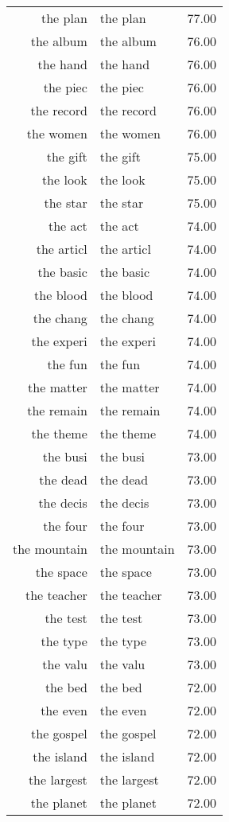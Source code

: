 \begin{table}[ht]
\begin{tabular}{rlr}
  the plan & the plan & 77.00 \\ 
  the album & the album & 76.00 \\ 
  the hand & the hand & 76.00 \\ 
  the piec & the piec & 76.00 \\ 
  the record & the record & 76.00 \\ 
  the women & the women & 76.00 \\ 
  the gift & the gift & 75.00 \\ 
  the look & the look & 75.00 \\ 
  the star & the star & 75.00 \\ 
  the act & the act & 74.00 \\ 
  the articl & the articl & 74.00 \\ 
  the basic & the basic & 74.00 \\ 
  the blood & the blood & 74.00 \\ 
  the chang & the chang & 74.00 \\ 
  the experi & the experi & 74.00 \\ 
  the fun & the fun & 74.00 \\ 
  the matter & the matter & 74.00 \\ 
  the remain & the remain & 74.00 \\ 
  the theme & the theme & 74.00 \\ 
  the busi & the busi & 73.00 \\ 
  the dead & the dead & 73.00 \\ 
  the decis & the decis & 73.00 \\ 
  the four & the four & 73.00 \\ 
  the mountain & the mountain & 73.00 \\ 
  the space & the space & 73.00 \\ 
  the teacher & the teacher & 73.00 \\ 
  the test & the test & 73.00 \\ 
  the type & the type & 73.00 \\ 
  the valu & the valu & 73.00 \\ 
  the bed & the bed & 72.00 \\ 
  the even & the even & 72.00 \\ 
  the gospel & the gospel & 72.00 \\ 
  the island & the island & 72.00 \\ 
  the largest & the largest & 72.00 \\ 
  the planet & the planet & 72.00 \\ 

\end{tabular}
\end{table}
